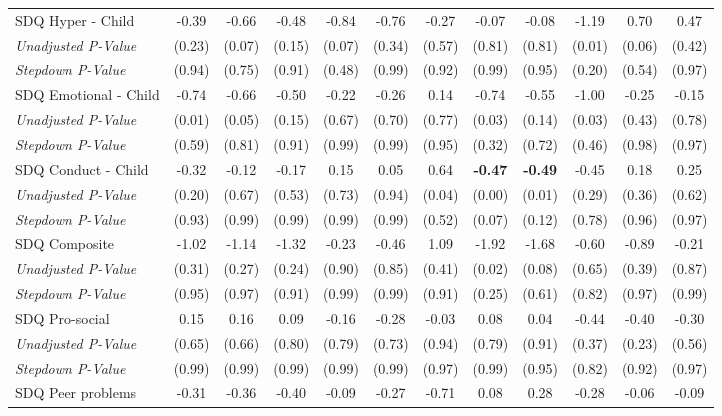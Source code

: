 \begin{tabular}{l c c c c c c c c c c c}
SDQ Hyper - Child & -0.39 & -0.66 & -0.48 & -0.84 & -0.76 & -0.27 & -0.07 & -0.08 & -1.19 & 0.70 & 0.47 \\
\quad \textit{Unadjusted P-Value} & (0.23) & (0.07) & (0.15) & (0.07) & (0.34) & (0.57) & (0.81) & (0.81) & (0.01) & (0.06) & (0.42) \\
\quad \textit{Stepdown P-Value} & (0.94) & (0.75) & (0.91) & (0.48) & (0.99) & (0.92) & (0.99) & (0.95) & (0.20) & (0.54) & (0.97) \\
SDQ Emotional - Child & -0.74 & -0.66 & -0.50 & -0.22 & -0.26 & 0.14 & -0.74 & -0.55 & -1.00 & -0.25 & -0.15 \\
\quad \textit{Unadjusted P-Value} & (0.01) & (0.05) & (0.15) & (0.67) & (0.70) & (0.77) & (0.03) & (0.14) & (0.03) & (0.43) & (0.78) \\
\quad \textit{Stepdown P-Value} & (0.59) & (0.81) & (0.91) & (0.99) & (0.99) & (0.95) & (0.32) & (0.72) & (0.46) & (0.98) & (0.97) \\
SDQ Conduct - Child & -0.32 & -0.12 & -0.17 & 0.15 & 0.05 & 0.64 & \textbf{ -0.47 } & \textbf{ -0.49 } & -0.45 & 0.18 & 0.25 \\
\quad \textit{Unadjusted P-Value} & (0.20) & (0.67) & (0.53) & (0.73) & (0.94) & (0.04) & (0.00) & (0.01) & (0.29) & (0.36) & (0.62) \\
\quad \textit{Stepdown P-Value} & (0.93) & (0.99) & (0.99) & (0.99) & (0.99) & (0.52) & (0.07) & (0.12) & (0.78) & (0.96) & (0.97) \\
SDQ Composite & -1.02 & -1.14 & -1.32 & -0.23 & -0.46 & 1.09 & -1.92 & -1.68 & -0.60 & -0.89 & -0.21 \\
\quad \textit{Unadjusted P-Value} & (0.31) & (0.27) & (0.24) & (0.90) & (0.85) & (0.41) & (0.02) & (0.08) & (0.65) & (0.39) & (0.87) \\
\quad \textit{Stepdown P-Value} & (0.95) & (0.97) & (0.91) & (0.99) & (0.99) & (0.91) & (0.25) & (0.61) & (0.82) & (0.97) & (0.99) \\
SDQ Pro-social & 0.15 & 0.16 & 0.09 & -0.16 & -0.28 & -0.03 & 0.08 & 0.04 & -0.44 & -0.40 & -0.30 \\
\quad \textit{Unadjusted P-Value} & (0.65) & (0.66) & (0.80) & (0.79) & (0.73) & (0.94) & (0.79) & (0.91) & (0.37) & (0.23) & (0.56) \\
\quad \textit{Stepdown P-Value} & (0.99) & (0.99) & (0.99) & (0.99) & (0.99) & (0.97) & (0.99) & (0.95) & (0.82) & (0.92) & (0.97) \\
SDQ Peer problems & -0.31 & -0.36 & -0.40 & -0.09 & -0.27 & -0.71 & 0.08 & 0.28 & -0.28 & -0.06 & -0.09 \\

\end{tabular}
